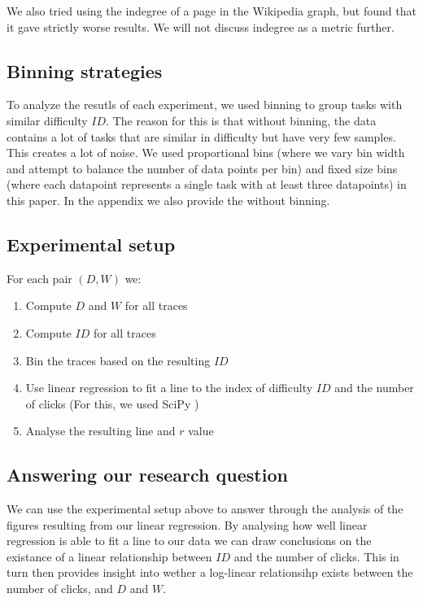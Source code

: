 We also tried using the indegree of a page in the Wikipedia graph, but found that it gave strictly worse results. We will not discuss indegree as a metric further.

\subsection{Binning strategies}
To analyze the resutls of each experiment, we used binning to group tasks with similar difficulty $ID$. The reason for this is that without binning, the data contains a lot of tasks that are similar in difficulty but have very few samples. This creates a lot of noise. We  used proportional bins (where we vary bin width and attempt to balance the number of data points per bin) and fixed size bins (where each datapoint represents a single task with at least three datapoints) in this paper. In the appendix we also provide the without binning.

\subsection{Experimental setup}
For each pair $(D,W)$ we:
\begin{enumerate}
    \item Compute $D$ and $W$ for all traces 
    \item Compute $ID$ for all traces 
    \item Bin the traces based on the resulting $ID$ 
    \item Use linear regression to fit a line to the index of difficulty $ID$ and the number of clicks (For this, we used SciPy \cite{scipy})
    \item Analyse the resulting line and $r$ value
\end{enumerate}

\subsection{Answering our research question}
We can use the experimental setup above to answer  through the analysis of the figures resulting from our linear regression. By analysing how well linear regression is able to fit a line to our data we can draw conclusions on the existance of a linear relationship between $ID$ and the number of clicks. This in turn then provides insight into wether a log-linear relationsihp exists between the number of clicks, and $D$ and $W$.
 